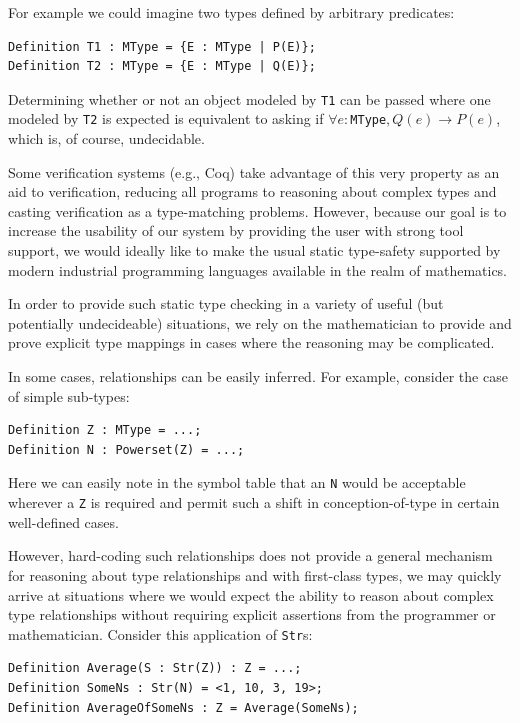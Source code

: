 For example we could imagine two types defined by arbitrary predicates:

\begin{lstlisting}
Definition T1 : MType = {E : MType | P(E)};
Definition T2 : MType = {E : MType | Q(E)};
\end{lstlisting}

Determining whether or not an object modeled by \texttt{T1} can be passed where one modeled by \texttt{T2} is expected is equivalent to asking if $\forall e : $\texttt{MType}$, Q(e) \rightarrow P(e)$, which is, of course, undecidable.

Some verification systems (e.g., Coq) take advantage of this very property as an aid to verification, reducing all programs to reasoning about complex types and casting verification as a type-matching problems.  However, because our goal is to increase the usability of our system by providing the user with strong tool support, we would ideally like to make the usual static type-safety supported by modern industrial programming languages available in the realm of mathematics.

In order to provide such static type checking in a variety of useful (but potentially undecideable) situations, we rely on the mathematician to provide and prove explicit type mappings in cases where the reasoning may be complicated.

In some cases, relationships can be easily inferred.  For example, consider the case of simple sub-types:

\begin{lstlisting}
Definition Z : MType = ...;
Definition N : Powerset(Z) = ...;
\end{lstlisting}

Here we can easily note in the symbol table that an \texttt{N} would be acceptable wherever a \texttt{Z} is required and permit such a shift in conception-of-type in certain well-defined cases.

However, hard-coding such relationships does not provide a general mechanism for reasoning about type relationships and with first-class types, we may quickly arrive at situations where we would expect the ability to reason about complex type relationships without requiring explicit assertions from the programmer or mathematician.  Consider this application of \texttt{Str}s:

\begin{lstlisting}
Definition Average(S : Str(Z)) : Z = ...;
Definition SomeNs : Str(N) = <1, 10, 3, 19>;
Definition AverageOfSomeNs : Z = Average(SomeNs);
\end{lstlisting}

